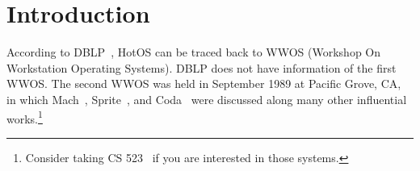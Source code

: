 \section{Introduction}
\label{sec:intro}

According to DBLP~\cite{dblp_hotos}, HotOS can be traced back to WWOS (Workshop On Workstation Operating Systems). DBLP does not have information of the first WWOS. The second WWOS was held in September 1989 at Pacific Grove, CA, in which Mach~\cite{Rashid:1989}, Sprite~\cite{Welch:1989}, and Coda~\cite{Satya:1989} were discussed along many other influential works.\footnote{Consider taking CS 523~\cite{cs523} if you are interested in those systems.}  
